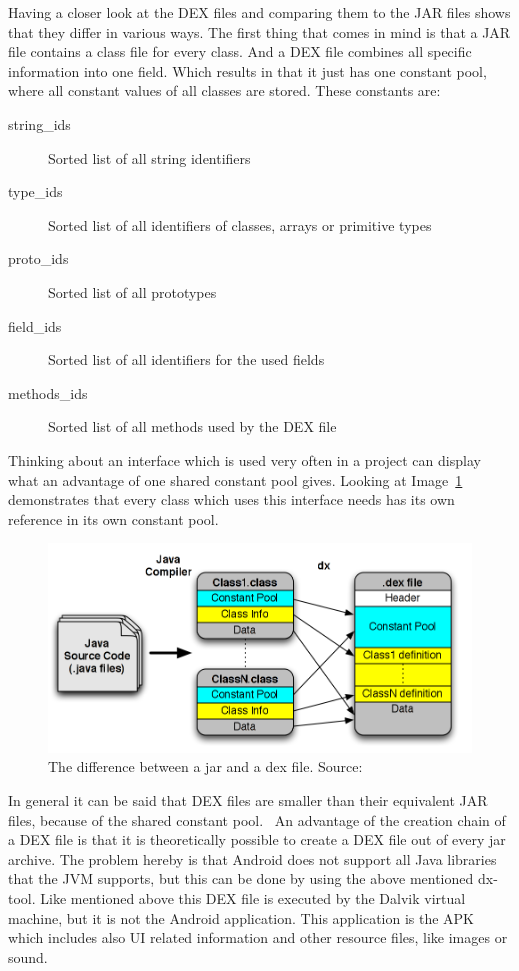 Having a closer look at the DEX files and comparing them to the JAR files shows that they differ in various ways.
The first thing that comes in mind is that a JAR file contains a class file for every class.
And a DEX file combines all specific information into one field.
Which results in that it just has one constant pool, where all constant values of all classes are stored.
These constants are:
\begin{description}
  \item[string\_ids] Sorted list of all string identifiers
  \item[type\_ids] Sorted list of all identifiers of classes, arrays or primitive types
  \item[proto\_ids] Sorted list of all prototypes
  \item[field\_ids] Sorted list of all identifiers for the used fields
  \item[methods\_ids] Sorted list of all methods used by the DEX file
\end{description}
Thinking about an interface which is used very often in a project can display what an advantage of one shared constant pool gives.
Looking at Image~\ref{fig:jar-dex} demonstrates that every class which uses this interface needs has its own reference in its own constant pool.
\begin{figure}[h]
\begin{center}
\includegraphics[scale=0.41]{images/jar-dex.png} 
\caption{The difference between a jar and a dex file. Source:~\cite{enck2011study}}
\label{fig:jar-dex}
\end{center}
\end{figure}

In general it can be said that DEX files are smaller than their equivalent JAR files, because of the shared constant pool.~\cite{bornstein2008dalvik}
An advantage of the creation chain of a DEX file is that it is theoretically possible to create a DEX file out of every jar archive.
The problem hereby is that Android does not support all Java libraries that the JVM supports, but this can be done by using the above mentioned dx-tool. 
Like mentioned above this DEX file is executed by the Dalvik virtual machine, but it is not the Android application.
This application is the APK  which includes also UI related information and other resource files, like images or sound.


